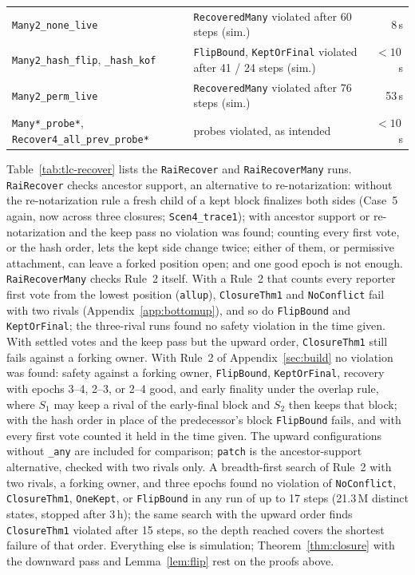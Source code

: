 \documentclass[conference]{IEEEtran}
\begin{document}
\begin{table}[t]
\begin{tabularx}{\textwidth}{@{}>{\raggedright\arraybackslash}p{}Yr@{}}
\texttt{Many2\_\allowbreak{}none\_\allowbreak{}live} & \texttt{RecoveredMany} violated after 60 steps (sim.) & 8\,s\\
\texttt{Many2\_\allowbreak{}hash\_\allowbreak{}flip},\allowbreak{} \texttt{\_\allowbreak{}hash\_\allowbreak{}kof} & \texttt{FlipBound}, \texttt{KeptOrFinal} violated after 41 / 24 steps (sim.) & $<10$\,s\\
\texttt{Many2\_\allowbreak{}perm\_\allowbreak{}live} & \texttt{RecoveredMany} violated after 76 steps (sim.) & 53\,s\\
\texttt{Many*\_\allowbreak{}probe*},\allowbreak{} \texttt{Recover4\_\allowbreak{}all\_\allowbreak{}prev\_\allowbreak{}probe*} & probes violated, as intended & $<10$\,s\\
\bottomrule
\end{tabularx}
\end{table}

Table~\ref{tab:tlc-recover} lists the \texttt{RaiRecover} and \texttt{RaiRecoverMany} runs. \texttt{RaiRecover} checks ancestor support, an alternative to re-notarization: without the re-notarization rule a fresh child of a kept block finalizes both sides (Case~5 again, now across three closures; \texttt{Scen4\_trace1}); with ancestor support or re-notarization and the keep pass no violation was found; counting every first vote, or the hash order, lets the kept side change twice; either of them, or permissive attachment, can leave a forked position open; and one good epoch is not enough. \texttt{RaiRecoverMany} checks Rule~2 itself. With a Rule~2 that counts every reporter first vote from the lowest position (\texttt{allup}), \texttt{ClosureThm1} and \texttt{NoConflict} fail with two rivals (Appendix~\ref{app:bottomup}), and so do \texttt{FlipBound} and \texttt{KeptOrFinal}; the three-rival runs found no safety violation in the time given. With settled votes and the keep pass but the upward order, \texttt{ClosureThm1} still fails against a forking owner. With Rule~2 of Appendix~\ref{sec:build} no violation was found: safety against a forking owner, \texttt{FlipBound}, \texttt{KeptOrFinal}, recovery with epochs 3--4, 2--3, or 2--4 good, and early finality under the overlap rule, where $S_1$ may keep a rival of the early-final block and $S_2$ then keeps that block; with the hash order in place of the predecessor's block \texttt{FlipBound} fails, and with every first vote counted it held in the time given. The upward configurations without \texttt{\_any} are included for comparison; \texttt{patch} is the ancestor-support alternative, checked with two rivals only. A breadth-first search of Rule~2 with two rivals, a forking owner, and three epochs found no violation of \texttt{NoConflict}, \texttt{ClosureThm1}, \texttt{OneKept}, or \texttt{FlipBound} in any run of up to 17 steps (21.3\,M distinct states, stopped after 3\,h); the same search with the upward order finds \texttt{ClosureThm1} violated after 15 steps, so the depth reached covers the shortest failure of that order. Everything else is simulation; Theorem~\ref{thm:closure} with the downward pass and Lemma~\ref{lem:flip} rest on the proofs above.
\end{document}
